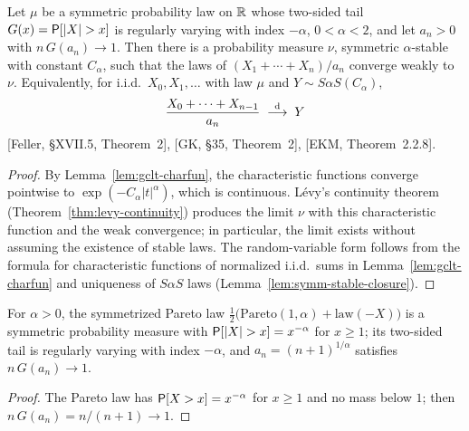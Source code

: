 \begin{theorem}
  \label{thm:gclt}
  \leanok
  Let $\mu$ be a symmetric probability law on $\mathbb{R}$ whose two-sided tail $G(x) = \mathsf{P}[|X| > x]$ is
  regularly varying with index $-\alpha$, $0 < \alpha < 2$, and let $a_n > 0$ with
  $n \, G(a_n) \to 1$. Then there is a probability measure $\nu$, symmetric $\alpha$-stable with
  constant $C_\alpha$, such that the laws of $(X_1 + \cdots + X_n)/a_n$ converge weakly to
  $\nu$. Equivalently, for i.i.d.\ $X_0, X_1, \ldots$ with law $\mu$ and $Y \sim S\alpha S(C_\alpha)$,
  \begin{align*}
    \frac{X_0 + \cdots + X_{n-1}}{a_n} \; \overset{\mathrm{d}}{\longrightarrow} \; Y
  \end{align*}
  [Feller, \S XVII.5, Theorem~2], [GK, \S35, Theorem~2], [EKM, Theorem~2.2.8].
\end{theorem}
\begin{proof}
  \leanok
  By Lemma~\ref{lem:gclt-charfun}, the characteristic functions converge pointwise to
  $\exp(-C_\alpha|t|^\alpha)$, which is continuous. Lévy's continuity theorem
  (Theorem~\ref{thm:levy-continuity}) produces the limit $\nu$ with this characteristic function
  and the weak convergence; in particular, the limit exists without assuming the existence of
  stable laws. The random-variable form follows from the formula for characteristic functions of
  normalized i.i.d.\ sums in Lemma~\ref{lem:gclt-charfun} and uniqueness of $S\alpha S$ laws
  (Lemma~\ref{lem:symm-stable-closure}).
\end{proof}

\begin{lemma}
  \label{lem:symm-pareto}
  \leanok
  For $\alpha > 0$, the symmetrized Pareto law $\frac{1}{2}\big( \mathrm{Pareto}(1, \alpha) +
  \mathrm{law}(-X) \big)$ is a symmetric probability measure with $\mathsf{P}[|X| > x] = x^{-\alpha}$ for
  $x \ge 1$; its two-sided tail is regularly varying with index $-\alpha$, and
  $a_n = (n + 1)^{1/\alpha}$ satisfies $n \, G(a_n) \to 1$.
\end{lemma}
\begin{proof}
  \leanok
  The Pareto law has $\mathsf{P}[X > x] = x^{-\alpha}$ for $x \ge 1$ and no mass below $1$; then
  $n \, G(a_n) = n/(n + 1) \to 1$.
\end{proof}

